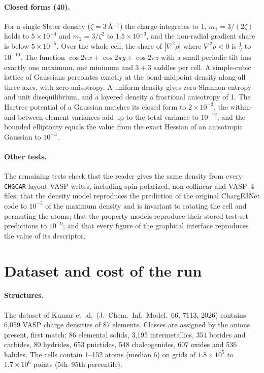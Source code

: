 \documentclass[journal=jctcce,manuscript=suppinfo,email=true]{achemso}
\begin{document}
\paragraph{Closed forms (40).} For a single Slater density
($\zeta=3$\,\AA$^{-1}$) the charge integrates to 1, $m_1=3/(2\zeta)$ holds to
$5\times10^{-4}$ and $m_2=3/\zeta^2$ to $1.5\times10^{-3}$, and the non-radial
gradient share is below $5\times10^{-5}$. Over the whole cell, the share of
$|\nabla^2\rho|$ where $\nabla^2\rho<0$ is $\tfrac12$ to $10^{-10}$. The
function $\cos2\pi x+\cos2\pi y+\cos2\pi z$ with a small periodic tilt has
exactly one maximum, one minimum and $3+3$ saddles per cell. A simple-cubic
lattice of Gaussians percolates exactly at the bond-midpoint density along all
three axes, with zero anisotropy. A uniform density gives zero Shannon entropy
and unit disequilibrium, and a layered density a fractional anisotropy of 1. The
Hartree potential of a Gaussian matches its closed form to $2\times10^{-3}$, the
within- and between-element variances add up to the total variance to
$10^{-12}$, and the bounded ellipticity equals the value from the exact Hessian
of an anisotropic Gaussian to $10^{-3}$.

\paragraph{Other tests.} The remaining tests check that the reader
gives the same density from every \texttt{CHGCAR} layout VASP writes, including
spin-polarized, non-collinear and VASP~4 files; that the density model
reproduces the prediction of the original ChargE3Net code to $10^{-5}$ of the
maximum density and is invariant to rotating the cell and permuting the atoms;
that the property models reproduce their stored test-set predictions to
$10^{-9}$; and that every figure of the graphical interface reproduces the value
of its descriptor.

\section{Dataset and cost of the run}
\label{si:dataset}

\paragraph{Structures.} The dataset of Kumar et~al.\ (J.\ Chem.\ Inf.\ Model.\ 66, 7113, 2026)
contains 6,059 VASP charge densities of 87 elements. Classes are assigned by the anions present,
first match: 86 elemental solids, 3,195 intermetallics, 354 borides and
carbides, 80 hydrides, 653 pnictides, 548 chalcogenides, 607 oxides and 536
halides. The cells contain 1--152 atoms (median 6) on grids of
$1.8\times10^5$ to $1.7\times10^6$ points (5th--95th percentile).
\end{document}
